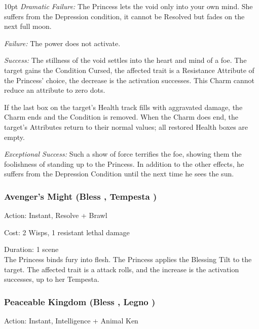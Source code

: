 \begin{myindentpar}{10pt}    \emph{Dramatic Failure:} The Princess lets the void only into your own mind. She suffers from the Depression condition, it cannot be Resolved but fades on the next full moon.

    \emph{Failure:} The power does not activate.

    \emph{Success:} The stillness of the void settles into the heart and mind of a foe. The target gains the Condition Cursed, the affected trait is a Resistance Attribute of the Princess' choice, the decrease is the activation successes. This Charm cannot reduce an attribute to zero dots. 
    
    If the last box on the target's Health track fills with aggravated damage, the Charm ends and the Condition is removed. When the Charm does end, the target's Attributes return to their normal values; all restored Health boxes are empty.

    \emph{Exceptional Success:} Such a show of force terrifies the foe, showing them the foolishness of standing up to the Princess. In addition to the other effects, he suffers from the Depression Condition until the next time he sees the sun.\end{myindentpar}

\subsubsection*{Avenger's Might (Bless \textbullet\textbullet\textbullet\textbullet, Tempesta \textbullet\textbullet)}

\noindent Action: Instant, Resolve + Brawl

\noindent Cost: 2 Wisps, 1 resistant lethal damage

\noindent Duration: 1 scene\\

\noindent The Princess binds fury into flesh. The Princess applies the Blessing Tilt to the target. The affected trait is a attack rolls, and the increase is the activation successes, up to her Tempesta.


\subsubsection*{Peaceable Kingdom (Bless \textbullet\textbullet\textbullet\textbullet\textbullet, Legno \textbullet\textbullet\textbullet\textbullet)}

\noindent Action: Instant, Intelligence + Animal Ken

